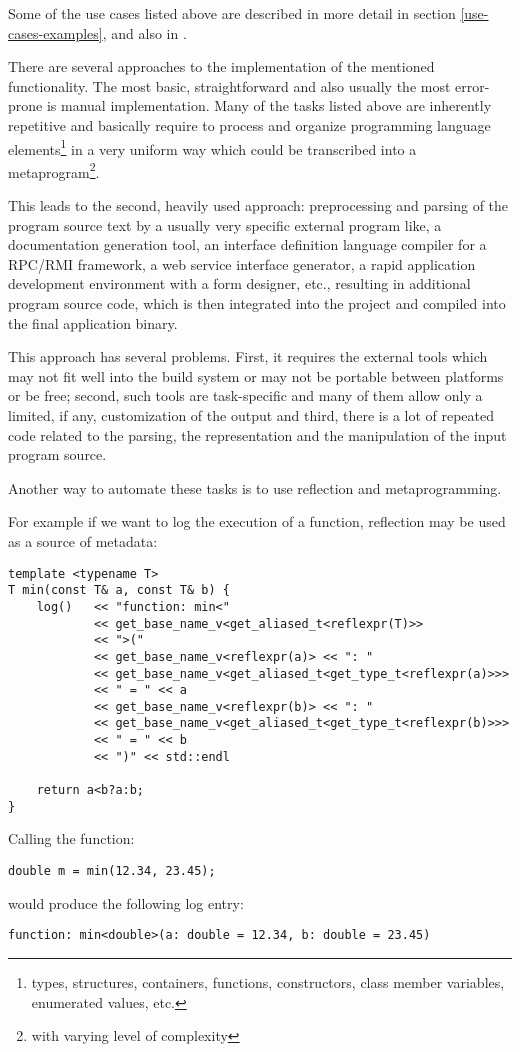 Some of the use cases listed above are described in more detail in section
\ref{use-cases-examples}, and also in \cite{Chochlik-P0385R1,Chochlik-N4452}.

There are several approaches to the implementation of the mentioned functionality.
The most basic, straightforward and also usually the most
error-prone is manual implementation. Many of the tasks listed above
are inherently repetitive and basically require to process and organize
programming language elements\footnote{types, structures, containers, functions,
constructors, class member variables, enumerated values, etc.}
in a very uniform way which could be transcribed into a metaprogram\footnote{with
varying level of complexity}.

This leads to the second, heavily used approach: preprocessing
and parsing of the program source text by a usually very specific external
program like, a documentation generation tool, an interface definition language
compiler for a RPC/RMI framework, a web service interface generator,
a rapid application development environment with a form designer, etc.,
resulting in additional program source code, which is then integrated into
the project and compiled into the final application binary.

This approach has several problems. First, it requires the external
tools which may not fit well into the build system or may not be portable
between platforms or be free; second, such tools are task-specific
and many of them allow only a limited, if any, customization of the output
and third, there is a lot of repeated code related to the parsing, the
representation and the manipulation of the input program source.

Another way to automate these tasks is to use reflection and metaprogramming.

For example if we want to log the execution of a function, reflection may
be used as a source of metadata:

\begin{verbatim}
template <typename T>
T min(const T& a, const T& b) {
	log()   << "function: min<"
	        << get_base_name_v<get_aliased_t<reflexpr(T)>>
	        << ">("
	        << get_base_name_v<reflexpr(a)> << ": "
	        << get_base_name_v<get_aliased_t<get_type_t<reflexpr(a)>>>
	        << " = " << a
	        << get_base_name_v<reflexpr(b)> << ": "
	        << get_base_name_v<get_aliased_t<get_type_t<reflexpr(b)>>>
	        << " = " << b
	        << ")" << std::endl

	return a<b?a:b;
}
\end{verbatim}

Calling the \verb@min@ function:

\begin{verbatim}
double m = min(12.34, 23.45);
\end{verbatim}

would produce the following log entry:

\begin{verbatim}
function: min<double>(a: double = 12.34, b: double = 23.45)
\end{verbatim}

